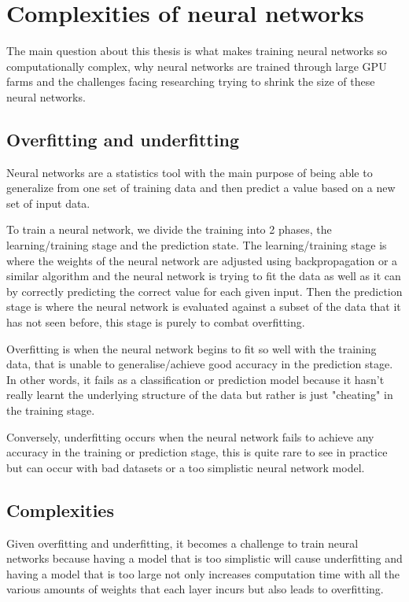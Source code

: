 \documentclass[a4paper,oneside,phd,etd]{BYUPhys}
\begin{document}
\section{Complexities of neural networks}
The main question about this thesis is what makes training neural networks so computationally complex, why neural networks are trained through large GPU farms and the challenges facing researching trying to shrink the size of these neural networks.

\subsection{Overfitting and underfitting}
Neural networks are a statistics tool with the main purpose of being able to generalize from one set of training data and then predict a value based on a new set of input data. 

To train a neural network, we divide the training into 2 phases, the learning/training stage and the prediction state. The learning/training stage is where the weights of the neural network are adjusted using backpropagation or a similar algorithm and the neural network is trying to fit the data as well as it can by correctly predicting the correct value for each given input. Then the prediction stage is where the neural network is evaluated against a subset of the data that it has not seen before, this stage is purely to combat overfitting\cite{overfitting}.

Overfitting is when the neural network begins to fit so well with the training data, that is unable to generalise/achieve good accuracy in the prediction stage. In other words, it fails as a classification or prediction model because it hasn't really learnt the underlying structure of the data but rather is just "cheating" in the training stage.

Conversely, underfitting occurs when the neural network fails to achieve any accuracy in the training or prediction stage, this is quite rare to see in practice but can occur with bad datasets or a too simplistic neural network model\cite{underfitting-machine-learning}.

\subsection{Complexities}
Given overfitting and underfitting, it becomes a challenge to train neural networks because having a model that is too simplistic will cause underfitting and having a model that is too large not only increases computation time with all the various amounts of weights that each layer incurs but also leads to overfitting\cite{model-complexity}. 
\end{document}
